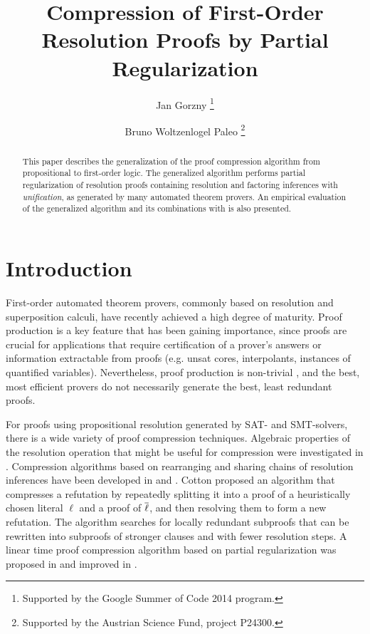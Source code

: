 \documentclass{llncs}
\title{Compression of First-Order Resolution Proofs by Partial Regularization} %
\author{
  Jan Gorzny\inst{1}
  \thanks{Supported by the Google Summer of Code 2014 program.}
  \and 
  Bruno Woltzenlogel Paleo\inst{2}
  \thanks{Supported by the Austrian Science Fund, project P24300.}
}
\institute{
  \email{jgorzny@uvic.ca}, University of Victoria, Canada
  \and 
  \email{bruno@logic.at}, Vienna University of Technology, Austria
}
\begin{document}
\maketitle


\begin{abstract}
This paper describes the generalization of the 
proof compression algorithm
\RecyclePivotsIntersection 
from propositional to first-order logic. The generalized algorithm performs partial regularization of resolution proofs containing resolution and factoring inferences with \emph{unification}, as generated by many automated theorem provers. An empirical evaluation of the generalized algorithm and its combinations with \SFOLowerUnits is also presented.
\end{abstract}


\setcounter{footnote}{0}

\section{Introduction} 

First-order automated theorem provers, commonly based on resolution and superposition calculi, have recently achieved a high degree of maturity. Proof production is a key feature that has been gaining importance, since proofs are crucial for applications that require certification of a prover's answers or information extractable from proofs (e.g. unsat cores, interpolants, instances of quantified variables). Nevertheless, proof production is non-trivial \cite{SchultzAPPA}, and the best, most efficient provers do not necessarily generate the best, least redundant proofs.

For proofs using propositional resolution generated by SAT- and SMT-solvers, there is a wide variety of proof compression techniques. Algebraic properties of the resolution operation that might be useful for compression were investigated in \cite{bwp10}.
Compression algorithms based on rearranging and sharing chains of resolution inferences have been
developed in \cite{Amjad07} and \cite{Sinz}.  Cotton \cite{CottonSplit} proposed an algorithm that
compresses a refutation by repeatedly splitting it into a proof of a heuristically chosen literal $\ell$
and a proof of $\overline{\ell}$, and then resolving them to form a new refutation.  The {\ReduceReconstruct} algorithm \cite{RedRec} searches for locally redundant
subproofs that can be rewritten into subproofs of stronger clauses and with fewer resolution steps.
A linear time proof compression algorithm based on partial
regularization was proposed in \cite{RP08} and improved in \cite{LURPI}.
\end{document}
